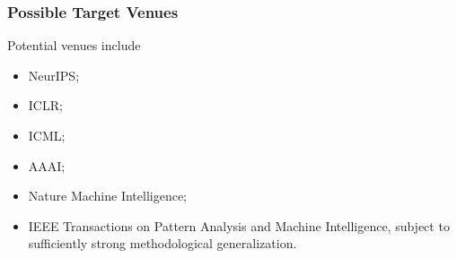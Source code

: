 \documentclass{article}
\begin{document}
\subsubsection{Possible Target Venues}
Potential venues include
\begin{itemize}
    \item NeurIPS;
    \item ICLR;
    \item ICML;
    \item AAAI;
    \item Nature Machine Intelligence;
    \item IEEE Transactions on Pattern Analysis and Machine Intelligence,
    subject to sufficiently strong methodological generalization.
\end{itemize}







\end{document}
